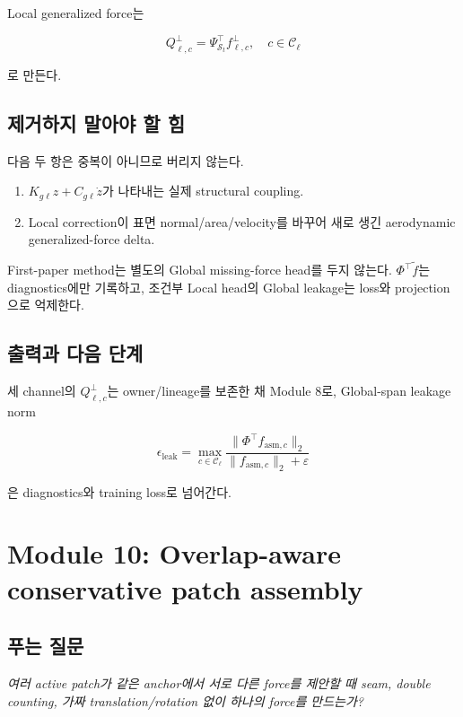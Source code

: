 \documentclass[11pt,a4paper]{article}
\newcommand{\eps}{\varepsilon}
\begin{document}
Local generalized force는

\begin{equation}
  Q_{\ell,c}^\perp
  =
  \Psi_{\mathcal S_t}^\top f_{\ell,c}^\perp,
  \quad c\in\mathcal C_\ell
\end{equation}

로 만든다.

\subsection*{제거하지 말아야 할 힘}

다음 두 항은 중복이 아니므로 버리지 않는다.

\begin{enumerate}[leftmargin=1.7em]
  \item \(K_{g\ell}z+C_{g\ell}\dot z\)가 나타내는 실제 structural coupling.
  \item Local correction이 표면 normal/area/velocity를 바꾸어 새로 생긴 aerodynamic generalized-force delta.
\end{enumerate}

First-paper method는 별도의 Global missing-force head를 두지 않는다.
\(\Phi^\top\widetilde f\)는 diagnostics에만 기록하고,
조건부 Local head의 Global leakage는 loss와 projection으로 억제한다.

\subsection*{출력과 다음 단계}

세 channel의 \(Q_{\ell,c}^\perp\)는 owner/lineage를 보존한 채 Module 8로,
Global-span leakage norm

\begin{equation}
  \epsilon_{\mathrm{leak}}
  =
  \max_{c\in\mathcal C_\ell}
  \frac{\|\Phi^\top f_{\mathrm{asm},c}\|_2}
  {\|f_{\mathrm{asm},c}\|_2+\eps}
\end{equation}

은 diagnostics와 training loss로 넘어간다.

\section{Module 10: Overlap-aware conservative patch assembly}

\subsection*{푸는 질문}

\emph{여러 active patch가 같은 anchor에서 서로 다른 force를 제안할 때
seam, double counting, 가짜 translation/rotation 없이 하나의 force를 만드는가?}
\end{document}
